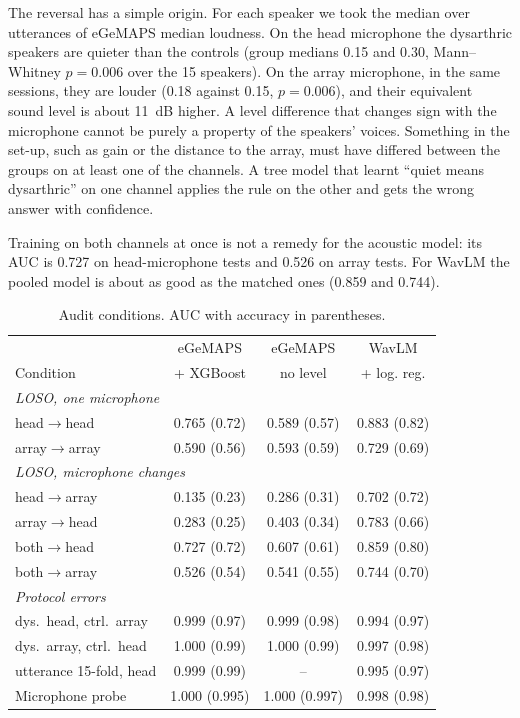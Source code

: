 \documentclass[conference]{IEEEtran}
\newcommand{\ra}{$\rightarrow$}
\begin{document}
The reversal has a simple origin. For each speaker we took the median over utterances of eGeMAPS median loudness. On the head microphone the dysarthric speakers are quieter than the controls (group medians 0.15 and 0.30, Mann--Whitney $p=0.006$ over the 15 speakers). On the array microphone, in the same sessions, they are louder (0.18 against 0.15, $p=0.006$), and their equivalent sound level is about 11~dB higher. A level difference that changes sign with the microphone cannot be purely a property of the speakers' voices. Something in the set-up, such as gain or the distance to the array, must have differed between the groups on at least one of the channels. A tree model that learnt ``quiet means dysarthric'' on one channel applies the rule on the other and gets the wrong answer with confidence.

Training on both channels at once is not a remedy for the acoustic model: its AUC is 0.727 on head-microphone tests and 0.526 on array tests. For WavLM the pooled model is about as good as the matched ones (0.859 and 0.744).

\begin{table}[t]
\caption{Audit conditions. AUC with accuracy in parentheses.}
\label{tab:audit}
\centering
\setlength{\tabcolsep}{3.5pt}
\begin{tabular}{lccc}
\toprule
 & eGeMAPS & eGeMAPS & WavLM\\
Condition & + XGBoost & no level & + log. reg.\\
\midrule
\multicolumn{4}{l}{\emph{LOSO, one microphone}}\\
head\ra head & 0.765 (0.72) & 0.589 (0.57) & 0.883 (0.82)\\
array\ra array & 0.590 (0.56) & 0.593 (0.59) & 0.729 (0.69)\\
\multicolumn{4}{l}{\emph{LOSO, microphone changes}}\\
head\ra array & 0.135 (0.23) & 0.286 (0.31) & 0.702 (0.72)\\
array\ra head & 0.283 (0.25) & 0.403 (0.34) & 0.783 (0.66)\\
both\ra head & 0.727 (0.72) & 0.607 (0.61) & 0.859 (0.80)\\
both\ra array & 0.526 (0.54) & 0.541 (0.55) & 0.744 (0.70)\\
\multicolumn{4}{l}{\emph{Protocol errors}}\\
dys.\ head, ctrl.\ array & 0.999 (0.97) & 0.999 (0.98) & 0.994 (0.97)\\
dys.\ array, ctrl.\ head & 1.000 (0.99) & 1.000 (0.99) & 0.997 (0.98)\\
utterance 15-fold, head & 0.999 (0.99) & -- & 0.995 (0.97)\\
\midrule
Microphone probe & 1.000 (0.995) & 1.000 (0.997) & 0.998 (0.98)\\
\bottomrule
\end{tabular}
\end{table}
\end{document}
